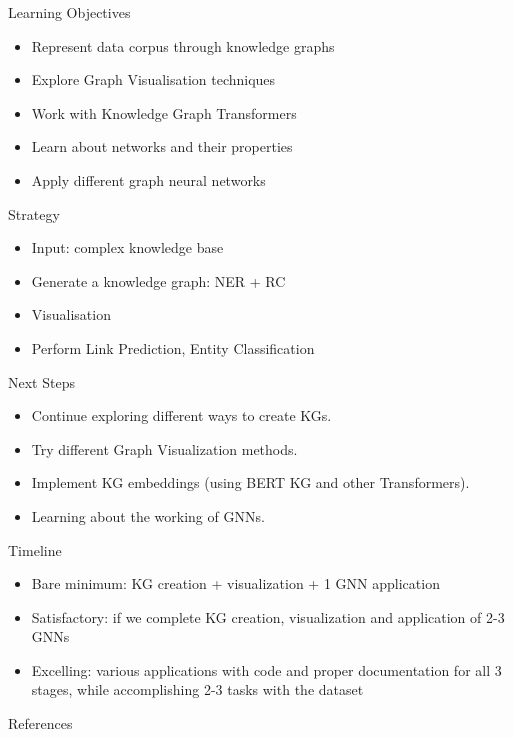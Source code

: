 \documentclass{beamer}
\begin{document}
\begin{frame}{Learning Objectives}
    \begin{itemize}
        \item Represent data corpus through knowledge graphs \cite{paper}
        \item Explore Graph Visualisation techniques
        \item Work with Knowledge Graph Transformers
        \item Learn about networks and their properties
        \item Apply different graph neural networks
    \end{itemize}
\end{frame}

\begin{frame}{Strategy}
    \begin{itemize}
        \item Input: complex knowledge base
        \item Generate a knowledge graph: NER + RC 
        \item Visualisation
        \item Perform Link Prediction, Entity Classification
    \end{itemize}
\end{frame}

\begin{frame}{Next Steps}
    \begin{itemize}
        \item Continue exploring different ways to create KGs.
        \item Try different Graph Visualization methods. 
        \item Implement KG embeddings (using BERT KG and other Transformers).
        \item Learning about the working of GNNs.
    \end{itemize}
\end{frame}

\begin{frame}{Timeline}
    \begin{itemize}
        \item Bare minimum: KG creation + visualization + 1 GNN application
        \item Satisfactory: if we complete KG creation, visualization and application of 2-3 GNNs 
        \item Excelling: various applications with code and proper documentation for all 3 stages, while accomplishing 2-3 tasks with the dataset
    \end{itemize}
\end{frame}

\begin{frame}{References}
    \printbibliography
\end{frame}
\end{document}
